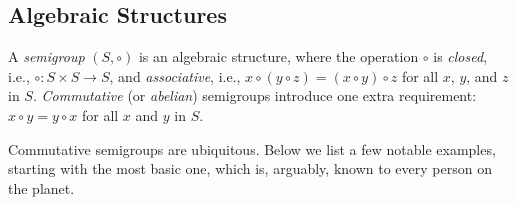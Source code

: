 \subsection{Algebraic Structures}\label{subsec:algstr}

A \emph{semigroup} $(S, \circ)$ is an algebraic structure, where the operation
$\circ$ is \emph{closed}, i.e., $\circ : S\times S \rightarrow S$, and
\emph{associative}, i.e.,
$x \circ (y \circ z) = (x \circ y) \circ z$ for all $x$, $y$, and $z$ in $S$.
\emph{Commutative} (or \emph{abelian}) semigroups introduce one extra
requirement: $x \circ y = y \circ x$ for all $x$ and $y$ in $S$.

Commutative semigroups are ubiquitous. Below we list a few
notable examples, starting with the most basic one, which is, arguably, known
to every person on the planet.


